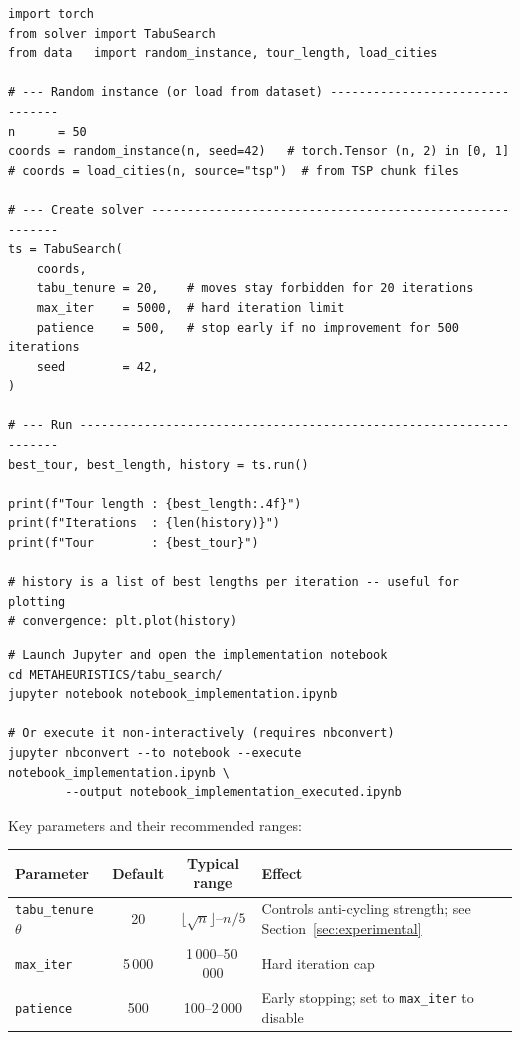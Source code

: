 \documentclass[12pt,a4paper]{article}
\begin{document}
\begin{lstlisting}[style=pythonstyle,
  caption={Creation, run, and result inspection
           (\texttt{solver.py} + \texttt{data.py})}]
import torch
from solver import TabuSearch
from data   import random_instance, tour_length, load_cities

# --- Random instance (or load from dataset) --------------------------------
n      = 50
coords = random_instance(n, seed=42)   # torch.Tensor (n, 2) in [0, 1]
# coords = load_cities(n, source="tsp")  # from TSP chunk files

# --- Create solver ---------------------------------------------------------
ts = TabuSearch(
    coords,
    tabu_tenure = 20,    # moves stay forbidden for 20 iterations
    max_iter    = 5000,  # hard iteration limit
    patience    = 500,   # stop early if no improvement for 500 iterations
    seed        = 42,
)

# --- Run -------------------------------------------------------------------
best_tour, best_length, history = ts.run()

print(f"Tour length : {best_length:.4f}")
print(f"Iterations  : {len(history)}")
print(f"Tour        : {best_tour}")

# history is a list of best lengths per iteration -- useful for plotting
# convergence: plt.plot(history)
\end{lstlisting}

\begin{lstlisting}[style=bashstyle,
  caption={Running the benchmark notebook from the command line}]
# Launch Jupyter and open the implementation notebook
cd METAHEURISTICS/tabu_search/
jupyter notebook notebook_implementation.ipynb

# Or execute it non-interactively (requires nbconvert)
jupyter nbconvert --to notebook --execute notebook_implementation.ipynb \
        --output notebook_implementation_executed.ipynb
\end{lstlisting}

Key parameters and their recommended ranges:

\begin{center}
\begin{tabularx}{\linewidth}{lccX}
\toprule
\textbf{Parameter} & \textbf{Default} & \textbf{Typical range} &
  \textbf{Effect} \\
\midrule
\texttt{tabu\_tenure} $\theta$ & 20 & $\lfloor\sqrt{n}\rfloor$--$n/5$ &
  Controls anti-cycling strength; see Section~\ref{sec:experimental} \\
\texttt{max\_iter}   & 5\,000 & 1\,000--50\,000 &
  Hard iteration cap \\
\texttt{patience}    & 500 & 100--2\,000 &
  Early stopping; set to \texttt{max\_iter} to disable \\
\bottomrule
\end{tabularx}
\end{center}
\end{document}
